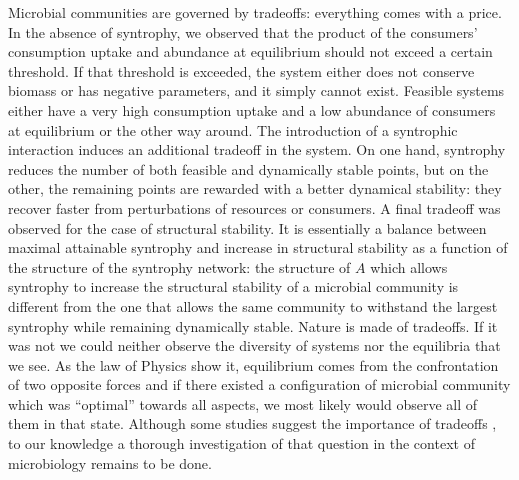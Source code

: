 \documentclass[12pt, titlepage]{report}
\begin{document}
Microbial communities are governed by tradeoffs: everything comes with a price.
In the absence of syntrophy, we observed that the product of the consumers' consumption uptake and abundance at equilibrium should not exceed a certain threshold. If that threshold is exceeded, the system either does not conserve biomass or has negative parameters, and it simply cannot exist. Feasible systems either have a very high consumption uptake and a low abundance of consumers at equilibrium or the other way around. The introduction of a syntrophic interaction induces an additional tradeoff in the system. On one hand, syntrophy reduces the number of both feasible and dynamically stable points, but on the other, the remaining points are rewarded with a better dynamical stability: they recover faster from perturbations of resources or consumers. A final tradeoff was observed for the case of structural stability. It is essentially a balance between maximal attainable syntrophy and increase in structural stability as a function of the structure of the syntrophy network: the structure of $A$ which allows syntrophy to increase the structural stability of a microbial community is different from the one that allows the same community to withstand the largest syntrophy while remaining dynamically stable. Nature is made of tradeoffs. If it was not we could neither observe the diversity of systems nor the equilibria that we see. As the law of Physics show it, equilibrium comes from the confrontation of two opposite forces and if there existed a configuration of microbial community which was ``optimal'' towards all aspects, we most likely would observe all of them in that state. Although some studies suggest the importance of tradeoffs \cite{pfeiffer_evolutionary_2002, lawrence_species_2012}, to our knowledge a thorough investigation of that question in the context of microbiology remains to be done.
\end{document}
